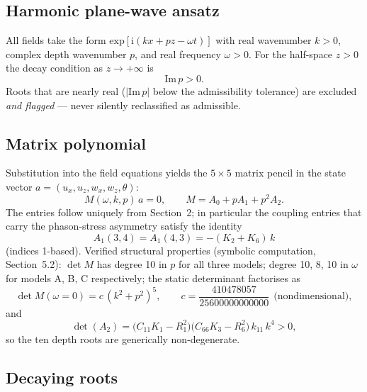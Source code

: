 \documentclass[11pt]{article}
\newcommand{\om}{\omega}
\newcommand{\tht}{\theta}
\begin{document}
\subsection{Harmonic plane-wave ansatz}

All fields take the form $\mathrm{exp}[\mathrm{i}(kx+pz-\om t)]$ with real wavenumber $k>0$, complex depth wavenumber $p$, and real frequency $\om>0$. For the half-space $z>0$ the decay condition as $z\to+\infty$ is
\begin{equation}
\mathrm{Im}\,p>0. \label{eq:decay}
\end{equation}
Roots that are nearly real ($|\mathrm{Im}\,p|$ below the admissibility tolerance) are excluded \emph{and flagged} --- never silently reclassified as admissible.

\subsection{Matrix polynomial}

Substitution into the field equations yields the $5\times5$ matrix pencil in the state vector $a=(u_x,u_z,w_x,w_z,\tht)$:
\begin{equation}
M(\om,k,p)\,a=0,\qquad M=A_0+pA_1+p^2A_2. \label{eq:Mpoly}
\end{equation}
The entries follow uniquely from Section~2; in particular the coupling entries that carry the phason-stress asymmetry satisfy the identity
\begin{equation}
A_1(3,4)=A_1(4,3)=-(K_2+K_6)\,k \label{eq:A1ident}
\end{equation}
(indices 1-based). Verified structural properties (symbolic computation, Section~5.2): $\det M$ has degree 10 in $p$ for all three models; degree 10, 8, 10 in $\om$ for models A, B, C respectively; the static determinant factorises as
\begin{equation}
\det M(\om=0)=c\,(k^2+p^2)^5,\qquad c=\frac{410478057}{25600000000000}\ \ \text{(nondimensional)}, \label{eq:statfact}
\end{equation}
and
\begin{equation}
\det(A_2)=\big(C_{11}K_1-R_1^2\big)\big(C_{66}K_3-R_6^2\big)\,k_{11}\,k^4>0, \label{eq:detA2}
\end{equation}
so the ten depth roots are generically non-degenerate.

\subsection{Decaying roots}
\end{document}
